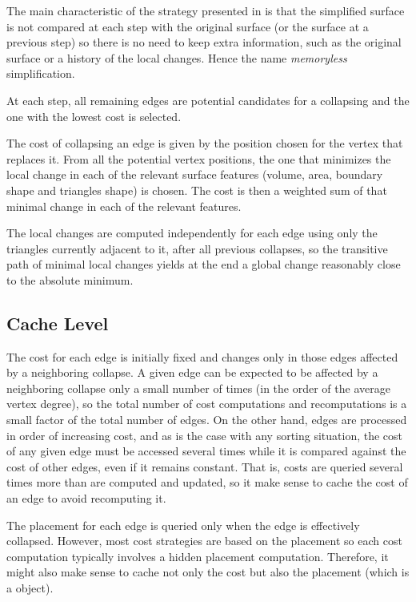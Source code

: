 The main characteristic of the strategy presented in
\cite{cgal:lt-fmeps-98,cgal:lt-ems-99} is that the simplified surface
is not compared at each step with the original surface (or the surface
at a previous step) so there is no need to keep extra information,
such as the original surface or a history of the local changes. Hence
the name {\em memoryless} simplification.

At each step, all remaining edges are potential candidates for a
collapsing and the one with the lowest cost is selected.

The cost of collapsing an edge is given by the position chosen for the
vertex that replaces it. From all the potential vertex positions, the
one that minimizes the local change in each of the relevant surface
features (volume, area, boundary shape and triangles shape) is
chosen. The cost is then a weighted sum of that minimal change in each
of the relevant features.

 The local changes are computed independently for each edge using only
the triangles currently adjacent to it, after all previous
collapses, so the transitive path of minimal local changes yields at
the end a global change reasonably close to the absolute minimum.

\subsection{Cache Level}

The cost for each edge is initially fixed and changes only in those edges 
affected by a neighboring collapse. A given edge can be expected to be 
affected by a neighboring collapse only a small number of times 
(in the order of the average vertex degree), so the total number of 
cost computations and recomputations is a small factor of
the total number of edges. 
On the other hand, edges are processed in order of increasing cost, and as is 
the case with any sorting situation, the cost of any given edge must be accessed 
several times while it is compared against the cost of other edges, even if it 
remains constant. That is, costs are queried several times more than are computed 
and updated, so it make sense to cache the cost of an edge to avoid recomputing it.

The placement for each edge is queried only when the edge is effectively collapsed. 
However, most cost strategies are based on the placement so each cost computation 
typically involves a hidden placement computation. Therefore, it might also make sense
to cache not only the cost but also the placement (which is a  object).

